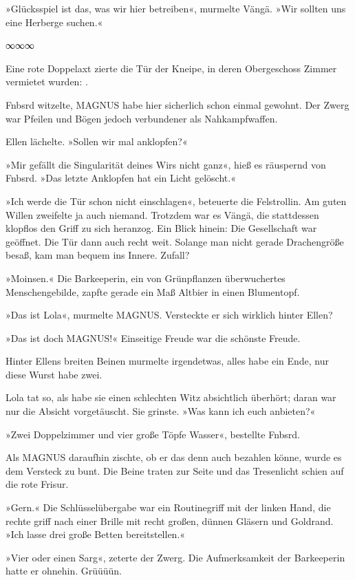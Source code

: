 »Glücksspiel ist das, was wir hier betreiben«, murmelte Vängä. »Wir sollten uns eine Herberge suchen.«

\begin{center}
∞∞∞
\end{center}

Eine rote Doppelaxt zierte die Tür der Kneipe, in deren Obergeschoss Zimmer vermietet wurden: .

Fnbsrd witzelte, MAGNUS habe hier sicherlich schon einmal gewohnt. Der Zwerg war Pfeilen und Bögen jedoch verbundener als Nahkampfwaffen.

Ellen lächelte. »Sollen wir mal anklopfen?«

»Mir gefällt die Singularität deines Wirs nicht ganz«, hieß es räuspernd von Fnbsrd. »Das letzte Anklopfen hat ein Licht gelöscht.«

»Ich werde die Tür schon nicht einschlagen«, beteuerte die Felstrollin. Am guten Willen zweifelte ja auch niemand. Trotzdem war es Vängä, die stattdessen klopflos den Griff zu sich heranzog. Ein Blick hinein: Die Gesellschaft war geöffnet. Die Tür dann auch recht weit. Solange man nicht gerade Drachengröße besaß, kam man bequem ins Innere. Zufall?

»Moinsen.« Die Barkeeperin, ein von Grünpflanzen überwuchertes Menschengebilde, zapfte gerade ein Maß Altbier in einen Blumentopf.

»Das ist Lola«, murmelte MAGNUS. Versteckte er sich wirklich hinter Ellen?

»Das ist doch MAGNUS!« Einseitige Freude war die schönste Freude.

Hinter Ellens breiten Beinen murmelte irgendetwas, alles habe ein Ende, nur diese Wurst habe zwei.

Lola tat so, als habe sie einen schlechten Witz absichtlich überhört; daran war nur die Absicht vorgetäuscht. Sie grinste. »Was kann ich euch anbieten?«

»Zwei Doppelzimmer und vier große Töpfe Wasser«, bestellte Fnbsrd.

Als MAGNUS daraufhin zischte, ob er das denn auch bezahlen könne, wurde es dem Versteck zu bunt. Die Beine traten zur Seite und das Tresenlicht schien auf die rote Frisur.

»Gern.« Die Schlüsselübergabe war ein Routinegriff mit der linken Hand, die rechte griff nach einer Brille mit recht großen, dünnen Gläsern und Goldrand. »Ich lasse drei große Betten bereitstellen.«

»Vier oder einen Sarg«, zeterte der Zwerg. Die Aufmerksamkeit der Barkeeperin hatte er ohnehin. Grüüüün.

